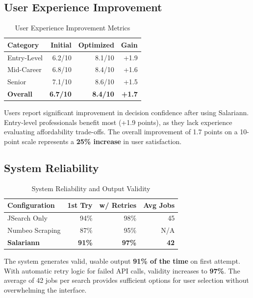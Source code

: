 \documentclass[12pt,a4paper,oneside]{report}
\begin{document}
\subsection{User Experience Improvement}

\begin{table}[H]
\centering
\caption{User Experience Improvement Metrics}
\label{tab:ux_improvement}
\begin{tabular}{|l|r|r|r|}
\hline
\textbf{Category} & \textbf{Initial} & \textbf{Optimized} & \textbf{Gain} \\
\hline
Entry-Level & 6.2/10 & 8.1/10 & +1.9 \\
\hline
Mid-Career & 6.8/10 & 8.4/10 & +1.6 \\
\hline
Senior & 7.1/10 & 8.6/10 & +1.5 \\
\hline
\textbf{Overall} & \textbf{6.7/10} & \textbf{8.4/10} & \textbf{+1.7} \\
\hline
\end{tabular}
\end{table}

Users report significant improvement in decision confidence after using Salariann. Entry-level professionals benefit most (+1.9 points), as they lack experience evaluating affordability trade-offs. The overall improvement of 1.7 points on a 10-point scale represents a \textbf{25\% increase} in user satisfaction.

\subsection{System Reliability}

\begin{table}[H]
\centering
\caption{System Reliability and Output Validity}
\label{tab:reliability}
\begin{tabular}{|l|r|r|r|}
\hline
\textbf{Configuration} & \textbf{1st Try} & \textbf{w/ Retries} & \textbf{Avg Jobs} \\
\hline
JSearch Only & 94\% & 98\% & 45 \\
\hline
Numbeo Scraping & 87\% & 95\% & N/A \\
\hline
\textbf{Salariann} & \textbf{91\%} & \textbf{97\%} & \textbf{42} \\
\hline
\end{tabular}
\end{table}

The system generates valid, usable output \textbf{91\% of the time} on first attempt. With automatic retry logic for failed API calls, validity increases to \textbf{97\%}. The average of 42 jobs per search provides sufficient options for user selection without overwhelming the interface.
\end{document}
